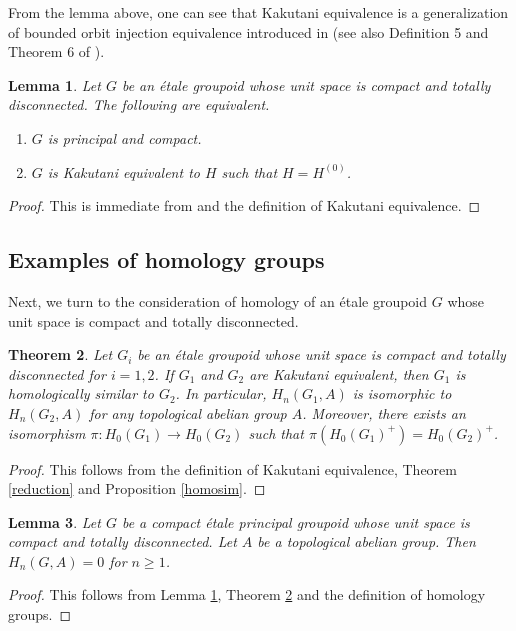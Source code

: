 \documentclass[11pt]{article}
\newtheorem{thm}{Theorem}[section]
\newtheorem{lem}[thm]{Lemma}
\theoremstyle{definition}
\begin{document}
From the lemma above, one can see that 
Kakutani equivalence is a generalization of 
bounded orbit injection equivalence introduced in \cite[Definition 1.3]{LaO} 
(see also Definition 5 and Theorem 6 of \cite{LiO}). 

\begin{lem}\label{cptKakutani}
Let $G$ be an \'etale groupoid 
whose unit space is compact and totally disconnected. 
The following are equivalent. 
\begin{enumerate}
\item $G$ is principal and compact. 
\item $G$ is Kakutani equivalent to $H$ such that $H=H^{(0)}$. 
\end{enumerate}
\end{lem}
\begin{proof}
This is immediate from \cite[Lemma 3.4]{GPS3} and 
the definition of Kakutani equivalence. 
\end{proof}


\subsection{Examples of homology groups}

Next, we turn to the consideration of homology of 
an \'etale groupoid $G$ 
whose unit space is compact and totally disconnected. 

\begin{thm}\label{Kakutani>sim}
Let $G_i$ be an \'etale groupoid 
whose unit space is compact and totally disconnected for $i=1,2$. 
If $G_1$ and $G_2$ are Kakutani equivalent, 
then $G_1$ is homologically similar to $G_2$. 
In particular, $H_n(G_1,A)$ is isomorphic to $H_n(G_2,A)$ 
for any topological abelian group $A$. 
Moreover, there exists an isomorphism $\pi:H_0(G_1)\to H_0(G_2)$ 
such that $\pi(H_0(G_1)^+)=H_0(G_2)^+$. 
\end{thm}
\begin{proof}
This follows from the definition of Kakutani equivalence, 
Theorem \ref{reduction} and Proposition \ref{homosim}. 
\end{proof}

\begin{lem}\label{cptHomology}
Let $G$ be a compact \'etale principal groupoid 
whose unit space is compact and totally disconnected. 
Let $A$ be a topological abelian group. 
Then $H_n(G,A)=0$ for $n\geq1$. 
\end{lem}
\begin{proof}
This follows from Lemma \ref{cptKakutani}, Theorem \ref{Kakutani>sim} 
and the definition of homology groups. 
\end{proof}
\end{document}

